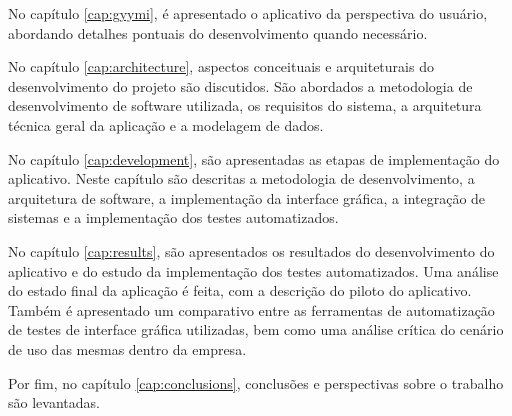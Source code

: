 No capítulo \ref{cap:gyymi}, é apresentado o aplicativo da perspectiva do usuário, abordando detalhes pontuais do desenvolvimento quando necessário.

No capítulo \ref{cap:architecture}, aspectos conceituais e arquiteturais do desenvolvimento do projeto são discutidos. São abordados a metodologia de desenvolvimento de software utilizada, os requisitos do sistema, a arquitetura técnica geral da aplicação e a modelagem de dados.

No capítulo \ref{cap:development}, são apresentadas as etapas de implementação do aplicativo. Neste capítulo são descritas a metodologia de desenvolvimento, a arquitetura de software, a implementação da interface gráfica, a integração de sistemas e a implementação dos testes automatizados.

No capítulo \ref{cap:results}, são apresentados os resultados do desenvolvimento do aplicativo e do estudo da implementação dos testes automatizados. Uma análise do estado final da aplicação é feita, com a descrição do piloto do aplicativo. Também é apresentado um comparativo entre as ferramentas de automatização de testes de interface gráfica utilizadas, bem como uma análise crítica do cenário de uso das mesmas dentro da empresa.

Por fim, no capítulo \ref{cap:conclusions}, conclusões e perspectivas sobre o trabalho são levantadas.
